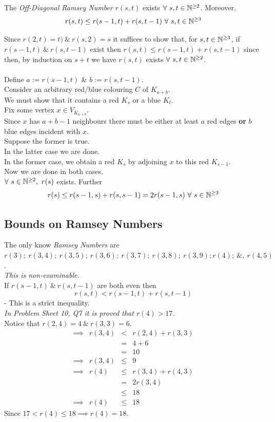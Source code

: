\documentclass[11pt,a4paper]{article}
\begin{document}
The \textit{Off-Diagonal Ramsey Number} $r(s,t)$ exists $\forall\ s,t\in\nats^{\geq2}$. Moreover,
$$r(s,t)\leq r(s-1,t)+r(s,t-1)\ \forall\ s,t\in\nats^{\geq3}$$

Since $r(2,t)=t)\ \&\ r(s,2)=s$ it suffices to show that, for $s,t\in\mathbb{N}^{\geq3}$, if $r(s-1,t)\ \&\ r(s,t-1)$ exist then $r(s,t)\leq r(s-1,t)+r(s,t-1)$ since then, by induction on $s+t$ we have $r(s,t)$ exists $\forall\ s,t\in\nats^{\geq2}$.\\
\\
Define $a:=r(s-1,t)$ \& $b:=r(s,t-1)$.\\
Consider an arbitrary red/blue colouring $C$ of $K_{a+b}$.\\
We must show that it contains a red $K_s$ or a blue $K_t$.\\
Fix some vertex $x\in V_{K_{a+b}}$.\\
Since $x$ has $a+b-1$ neighbours there must be either at least $a$ red edges \textbf{or} $b$ blue edges incident with $x$.\\
Suppose the former is true.\\
In the latter case we are done.\\
In the former case, we obtain a red $K_s$ by adjoining $x$ to this red $K_{s-1}$.\\
Now we are done in both cases.\\

$\forall\ s\in\mathbb{N}^{\geq2},\ r(s)$ exists. Further
$$r(s)\leq r(s-1,s)+r(s,s-1)=2r(s-1,s)\ \forall\ s\in\mathbb{N}^{\geq3}$$ 

\subsection{Bounds on Ramsey Numbers}

The only know \textit{Ramsey Numbers} are $r(3);\ r(3,4);\ r(3,5);\ r(3,6);\ r(3,7);\ r(3,8);\ r(3,9); r(4);\ \&,\ r(4,5)$.\\

\textit{This is non-examinable}.\\
If $r(s-1,t)\ \&\ r(s,t-1)$ are both even then
$$r(s,t)<r(s-1,t)+r(s,t-1)$$
\nb - This is a strict inequality.\\

\textit{In Problem Sheet 10, Q7 it is proved that $r(4)>17$}.\\
Notice that $r(2,4)=4\ \&\ r(3,3)=6$.
\[\begin{array}{rrcl}
\implies&r(3,4)&<&r(2,4)+r(3,3)\\
&&=&4+6\\
&&=&10\\
\implies&r(3,4)&\leq&9\\
\implies&r(4)&\leq&r(3,4)+r(4,3)\\
&&=&2r(3,4)\\
&&\leq&18\\
\implies&r(4)&\leq&18
\end{array}\]
Since $17<r(4)\leq 18\implies r(4)=18$.\\
\end{document}
